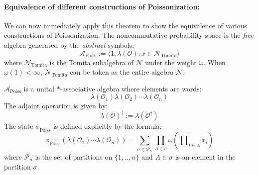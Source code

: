 \documentclass[a4paper,11pt]{article}
\theoremstyle{definition}
\numberwithin{equation}{section}
\begin{document}
\paragraph{Equivalence of different constructions of Poissonization:} We can now immediately apply this theorem to show the equivalence of various constructions of Poissonization. The noncommutative probability space is the \textit{free} algebra generated by the \textit{abstract} symbols:
\begin{equation}
    \mathcal{A}_\text{Poiss}:=\langle1,\lambda(\mathcal{O}):x\in\mathcal{N}_\text{Tomita}\rangle
\end{equation}
where $\mathcal{N}_\text{Tomita}$ is the Tomita subalgebra of $\mathcal{N}$ under the weight $\omega$. When $\omega(1) < \infty$, $\mathcal{N}_\text{Tomita}$ can be taken as the entire algebra $\mathcal{N}$.

$\mathcal{A}_\text{Poiss}$ is a unital $*$-associative algebra where elements are words:
\begin{equation}
    \lambda(\mathcal{O}_1)\lambda(\mathcal{O}_2)\cdots\lambda(\mathcal{O}_n)
\end{equation}
The adjoint operation is given by:
\begin{equation}
    \lambda(\mathcal{O})^\dagger := \lambda(\mathcal{O}^\dagger)
\end{equation}
The state $\phi_\text{Poiss}$ is defined explicitly by the formula:
\begin{equation}
    \phi_\text{Poiss}(\lambda(\mathcal{O}_1)\cdots\lambda(\mathcal{O}_n)) = \sum_{\sigma\in\mathcal{P}_n}\prod_{A\in\sigma}\omega(\overrightarrow{\prod}_{i\in A}x_i)
\end{equation}
where $\mathcal{P}_n$ is the set of partitions on $\{1,..,n\}$ and $A\in\sigma$ is an element in the partition $\sigma$. 
\end{document}
